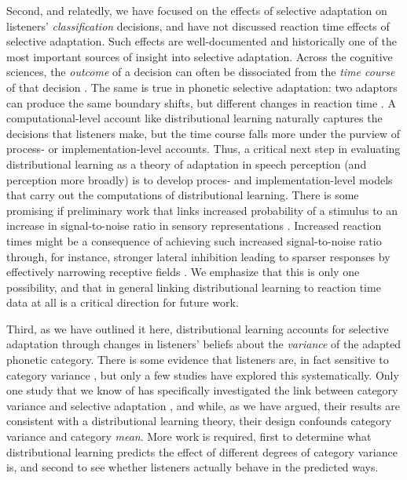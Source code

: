 Second, and relatedly, we have focused on the effects of selective adaptation on listeners' \emph{classification} decisions, and have not discussed reaction time effects of selective adaptation.  Such effects are well-documented \autocite{Samuel1986,Samuel1996} and historically one of the most important sources of insight into selective adaptation.  Across the cognitive sciences, the \emph{outcome} of a decision can often be dissociated from the \emph{time course} of that decision \autocite[see, e.g., the related discussion for lexical selection in speech production;][]{Mahon2007,Oppenheim2010}.  The same is true in phonetic selective adaptation: two adaptors can produce the same boundary shifts, but different changes in reaction time \autocite{Samuel1996}.  A computational-level account like distributional learning naturally captures the decisions that listeners make, but the time course falls more under the purview of process- or implementation-level accounts.  Thus, a critical next step in evaluating distributional learning as a theory of adaptation in speech perception (and perception more broadly) is to develop proces- and implementation-level models that carry out the computations  of distributional learning.  There is some promising if preliminary work that links increased probability of a stimulus to an increase in signal-to-noise ratio in sensory representations \autocite{Stocker2006,Wei2012}.  Increased reaction times might be a consequence of achieving such increased signal-to-noise ratio through, for instance, stronger lateral inhibition leading to sparser responses by effectively narrowing receptive fields \autocite{Gardner2004}.  We emphasize that this is only one possibility, and that in general linking distributional learning to reaction time data at all is a critical direction for future work.

Third, as we have outlined it here, distributional learning accounts for selective adaptation through changes in listeners' beliefs about the \emph{variance} of the adapted phonetic category.  There is some evidence that listeners are, in fact sensitive to category variance \autocite{Clayards2008,Cole1977,Newman2001,Schreiber2013}, but only a few studies have explored this systematically.  Only one study that we know of has specifically investigated the link between category variance and selective adaptation \autocite{Cole1977}, and while, as we have argued, their results are consistent with a distributional learning theory, their design confounds category variance and category \emph{mean}.  More work is required, first to determine what distributional learning predicts the effect of different degrees of category variance is, and second to see whether listeners actually behave in the predicted ways.

